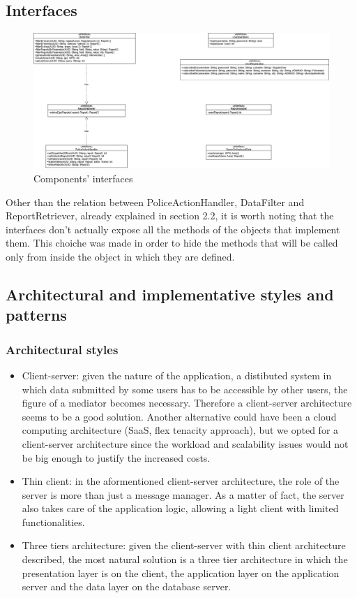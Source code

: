 \subsection{Interfaces}
\begin{figure}[H]
	\centering
	\includegraphics[width=\textwidth]{Images/interface_diagram}
	\caption{Components' interfaces}
\end{figure}
Other than the relation between PoliceActionHandler, DataFilter and ReportRetriever, already explained in section 2.2, it is worth noting that the interfaces don't actually expose all the methods of the objects that implement them. This choiche was made in order to hide the methods that will be called only from inside the object in which they are defined.
\newpage 

\subsection{Architectural and implementative styles and patterns}

\subsubsection{Architectural styles}
\begin{itemize}
	\item Client-server: given the nature of the application, a distibuted system in which data submitted by some users has to be accessible by other users, the figure of a mediator becomes necessary. Therefore a client-server architecture seems to be a good solution. Another alternative could have been a cloud computing architecture (SaaS, flex tenacity approach), but we opted for a client-server architecture since the workload and scalability issues would not be big enough to justify the increased costs.
	\item Thin client: in the aformentioned client-server architecture, the role of the server is more than just a message manager. As a matter of fact, the server also takes care of the application logic, allowing a light client with limited functionalities.
	\item Three tiers architecture: given the client-server with thin client architecture described, the most natural solution is a three tier architecture in which the presentation layer is on the client, the application layer on the application server and the data layer on the database server. 
\end{itemize}

